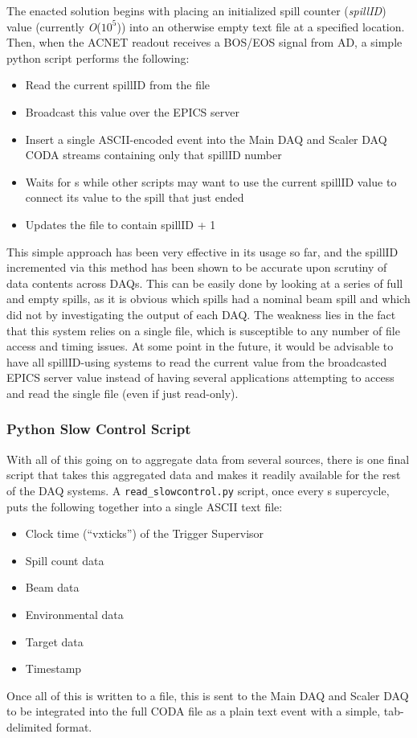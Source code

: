 The enacted solution begins with placing an initialized spill counter (\emph{spillID}) value (currently \emph{O}($10^5$)) into an otherwise empty text file at a specified location. Then, when the ACNET readout receives a BOS/EOS signal from AD, a simple python script performs the following:
\begin{itemize}
\item Read the current spillID from the file
\item Broadcast this value over the EPICS server
\item Insert a single ASCII-encoded event into the Main DAQ and Scaler DAQ CODA streams containing only that spillID number
\item Waits for \unit[20]{s} while other scripts may want to use the current spillID value to connect its value to the spill that just ended
\item Updates the file to contain spillID + 1
\end{itemize}

This simple approach has been very effective in its usage so far, and the spillID incremented via this method has been shown to be accurate upon scrutiny of data contents across DAQs. This can be easily done by looking at a series of full and empty spills, as it is obvious which spills had a nominal beam spill and which did not by investigating the output of each DAQ. The weakness lies in the fact that this system relies on a single file, which is susceptible to any number of file access and timing issues. At some point in the future, it would be advisable to have all spillID-using systems to read the current value from the broadcasted EPICS server value instead of having several applications attempting to access and read the single file (even if just read-only).

\subsubsection{Python Slow Control Script}

With all of this going on to aggregate data from several sources, there is one final script that takes this aggregated data and makes it readily available for the rest of the DAQ systems. A \verb|read_slowcontrol.py| script, once every \unit[60]{s} supercycle, puts the following together into a single ASCII text file:
\begin{itemize}
\item Clock time (``vxticks'') of the Trigger Supervisor
\item Spill count data
\item Beam data
\item Environmental data
\item Target data
\item Timestamp
\end{itemize}
Once all of this is written to a file, this is sent to the Main DAQ and Scaler DAQ to be integrated into the full CODA file as a plain text event with a simple, tab-delimited format.


